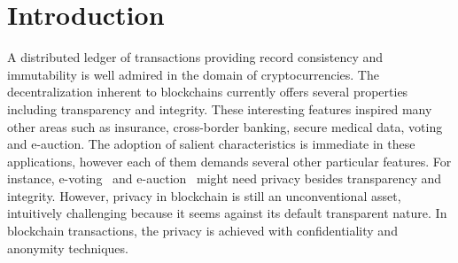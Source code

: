 \section{Introduction}
\label{sec-Introduction}
A distributed ledger of transactions providing record consistency and immutability is well admired in the domain of cryptocurrencies. The decentralization inherent to blockchains currently offers several properties including transparency and integrity. These interesting features inspired many other areas such as insurance, cross-border banking, secure medical data, voting and e-auction. The adoption of salient characteristics is immediate in these applications, however each of them demands several other particular features. For instance, e-voting~\cite{dossogne2010voting} and e-auction~\cite{sharma2021anonymous} might need privacy besides transparency and integrity. However, privacy in blockchain is still an unconventional asset, intuitively challenging because it seems against its default transparent nature. In blockchain transactions, the privacy is achieved with confidentiality and anonymity techniques. 

